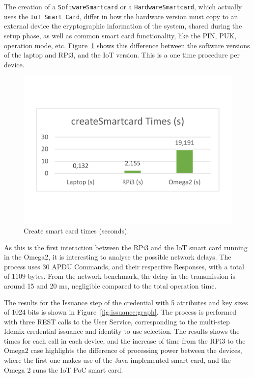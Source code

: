 The creation of a \texttt{SoftwareSmartcard} or a \texttt{HardwareSmartcard}, which actually uses the \texttt{IoT Smart Card}, differ in how the hardware version must copy to an external device the cryptographic information of the system, shared during the setup phase, as well as common smart card functionality, like the PIN, PUK, operation mode, etc. Figure~\ref{fig:createSmartCard:graph} shows this difference between the software versions of the laptop and RPi3, and the IoT version. This is a one time procedure per device.


\begin{figure}[bth]
	\centering
	\includegraphics[width=0.6\linewidth]{gfx/graphics/createSCGraph}
	\caption{Create smart card times (seconds).} 
	\label{fig:createSmartCard:graph} 
\end{figure}



As this is the first interaction between the RPi3 and the IoT smart card running in the Omega2, it is interesting to analyse the possible network delays. The process uses $30$ APDU Commands, and their respective Responses, with a total of $1109$ bytes. From the network benchmark, the delay in the transmission is around 15 and 20 ms, negligible compared to the total operation time.


\hfil

The results for the Issuance step of the credential with 5 attributes and key sizes of 1024 bits is shown in Figure~\ref{fig:issuance:graph}. The process is performed with three REST calls to the User Service, corresponding to the multi-step Idemix credential issuance and identity to use selection.  The results shows the times for each call in each device, and the increase of time from the RPi3 to the Omega2 case highlights the difference of processing power between the devices, where the first one makes use of the Java implemented smart card, and the Omega 2 runs the IoT PoC smart card.



